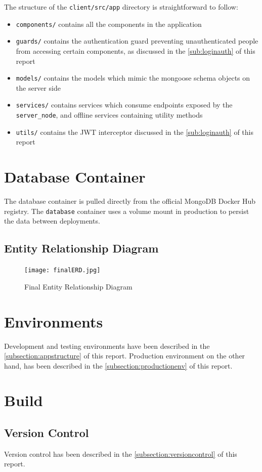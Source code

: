 The structure of the \texttt{client/src/app} directory is straightforward to follow:
\begin{itemize}
  \item \texttt{components/} contains all the components in the application
  \item \texttt{guards/} contains the authentication guard preventing unauthenticated people
    from accessing certain components, as discussed in the \autoref{sub:loginauth} of this report
  \item \texttt{models/} contains the models which mimic the mongoose schema objects on the server side
  \item \texttt{services/} contains services which consume endpoints exposed by the \texttt{server\_node},
    and offline services containing utility methods
  \item \texttt{utils/} contains the JWT interceptor discussed in the \autoref{sub:loginauth} of this report
\end{itemize}

\section{Database Container}
The database container is pulled directly from the official MongoDB Docker Hub registry.
The \texttt{database} container uses a volume mount in production to persist the data
between deployments.

\subsection{Entity Relationship Diagram}
\begin{figure}[h!]
    \centering
    \texttt{[image: finalERD.jpg]}
    \caption{Final Entity Relationship Diagram}
\end{figure}

\section{Environments}
Development and testing environments have been described in the \autoref{subsection:appstructure} of this report.
Production environment on the other hand, has been described in the \autoref{subsection:productionenv} of this report.

\section{Build}
\subsection{Version Control}
Version control has been described in the \autoref{subsection:versioncontrol} of this report.

